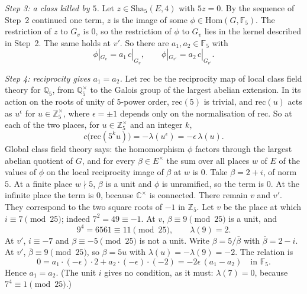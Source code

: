 \documentclass[11pt,letterpaper]{article}
\newcommand{\Z}{\mathbb Z}\newcommand{\Q}{\mathbb Q}\newcommand{\C}{\mathbb C}
\begin{document}
\emph{Step 3: a class killed by $5$.} Let $z\in\mathrm{Sha}_5(E,4)$ with $5z=0$. By the sequence of Step~2
continued one term, $z$ is the image of some $\phi\in\mathrm{Hom}(G,\mathbb F_5)$. The restriction of $z$ to $G_v$
is $0$, so the restriction of $\phi$ to $G_v$ lies in the kernel described in Step~2. The same holds at
$v'$. So there are $a_1,a_2\in\mathbb F_5$ with
\begin{equation}\label{D:349}
 \phi|_{G_v}=a_1\,c|_{G_v},\qquad \phi|_{G_{v'}}=a_2\,c|_{G_{v'}} .
\end{equation}

\emph{Step 4: reciprocity gives $a_1=a_2$.} Let $\mathrm{rec}$ be the reciprocity map of local class field
theory for $\Q_5$, from $\Q_5^\times$ to the Galois group of the largest abelian extension. In its action on
the roots of unity of $5$-power order, $\mathrm{rec}(5)$ is trivial, and $\mathrm{rec}(u)$ acts as $u^{\epsilon}$
for $u\in\Z_5^\times$, where $\epsilon=\pm1$ depends only on the normalisation of $\mathrm{rec}$. So at each
of the two places, for $u\in\Z_5^\times$ and an integer $k$,
\begin{equation}\label{D:350}
 c\big(\mathrm{rec}(5^ku)\big)=-\lambda(u^{\epsilon})=-\epsilon\,\lambda(u).
\end{equation}
Global class field theory says: the homomorphism $\phi$ factors through the largest abelian quotient of $G$,
and for every $\beta\in E^\times$ the sum over all places $w$ of $E$ of the values of $\phi$ on the local
reciprocity image of $\beta$ at $w$ is $0$. Take $\beta=2+i$, of norm $5$. At a finite place $w\nmid5$,
$\beta$ is a unit and $\phi$ is unramified, so the term is $0$. At the infinite place the term is $0$,
because $\C^\times$ is connected. There remain $v$ and $v'$. They correspond to the two square roots of $-1$
in $\Z_5$. Let $v$ be the place at which $i\equiv7\pmod{25}$; indeed $7^2=49\equiv-1$. At $v$,
$\beta\equiv9\pmod{25}$ is a unit, and
\begin{equation}\label{D:351}
 9^4=6561\equiv11\pmod{25},\qquad \lambda(9)=2 .
\end{equation}
At $v'$, $i\equiv-7$ and $\beta\equiv-5\pmod{25}$ is not a unit. Write $\beta=5/\bar\beta$ with
$\bar\beta=2-i$. At $v'$, $\bar\beta\equiv9\pmod{25}$, so $\beta=5u$ with $\lambda(u)=-\lambda(9)=-2$. The
relation is
\begin{equation}\label{D:352}
 0=a_1\cdot(-\epsilon)\cdot2+a_2\cdot(-\epsilon)\cdot(-2)=-2\epsilon\,(a_1-a_2)\quad\text{in }\mathbb F_5 .
\end{equation}
Hence $a_1=a_2$. (The unit $i$ gives no condition, as it must: $\lambda(7)=0$, because $7^4\equiv1\pmod{25}$.)
\end{document}
